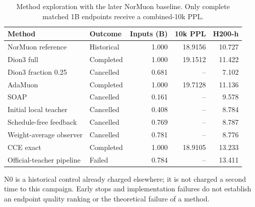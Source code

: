 \begin{table}[tbp]
\centering
\small
\caption{Method exploration with the later NorMuon baseline. Only complete matched 1B endpoints receive a combined-10k PPL.}
\label{tab:methods}
\begin{tabular}{llrrr}
\toprule
Method & Outcome & Inputs (B) & 10k PPL & H200-h \\
\midrule
NorMuon reference & Historical & 1.000 & 18.9156 & 10.727 \\
Dion3 full & Completed & 1.000 & 19.1512 & 11.422 \\
Dion3 fraction 0.25 & Cancelled & 0.681 & -- & 7.102 \\
AdaMuon & Completed & 1.000 & 19.7128 & 11.136 \\
SOAP & Cancelled & 0.161 & -- & 9.578 \\
Initial local teacher & Cancelled & 0.408 & -- & 8.784 \\
Schedule-free feedback & Cancelled & 0.769 & -- & 8.787 \\
Weight-average observer & Cancelled & 0.781 & -- & 8.776 \\
CCE exact & Completed & 1.000 & 18.9105 & 13.233 \\
Official-teacher pipeline & Failed & 0.784 & -- & 13.411 \\
\bottomrule
\end{tabular}
\par\vspace{3pt}\begin{minipage}{\linewidth}\footnotesize N0 is a historical control already charged elsewhere; it is not charged a second time to this campaign. Early stops and implementation failures do not establish an endpoint quality ranking or the theoretical failure of a method.\end{minipage}
\end{table}
